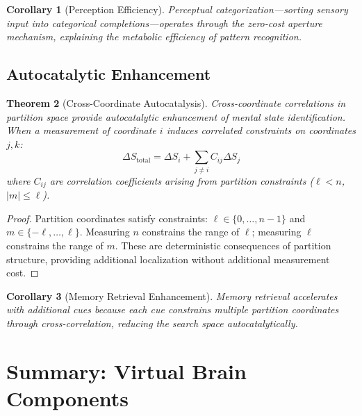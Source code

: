 \documentclass[aps,prd,twocolumn,superscriptaddress,floatfix,nofootinbib]{revtex4-2}
\newtheorem{theorem}{Theorem}[section]
\newtheorem{corollary}[theorem]{Corollary}
\theoremstyle{remark}
\begin{document}
\begin{corollary}[Perception Efficiency]
\label{cor:perception_efficiency}
Perceptual categorization---sorting sensory input into categorical completions---operates through the zero-cost aperture mechanism, explaining the metabolic efficiency of pattern recognition.
\end{corollary}

\subsection{Autocatalytic Enhancement}

\begin{theorem}[Cross-Coordinate Autocatalysis]
\label{thm:autocatalysis}
Cross-coordinate correlations in partition space provide autocatalytic enhancement of mental state identification. When a measurement of coordinate $i$ induces correlated constraints on coordinates $j, k$:
\begin{equation}
\Delta S_{\text{total}} = \Delta S_i + \sum_{j \neq i} C_{ij} \Delta S_j
\end{equation}
where $C_{ij}$ are correlation coefficients arising from partition constraints ($\ell < n$, $|m| \leq \ell$).
\end{theorem}

\begin{proof}
Partition coordinates satisfy constraints: $\ell \in \{0, \ldots, n-1\}$ and $m \in \{-\ell, \ldots, \ell\}$. Measuring $n$ constrains the range of $\ell$; measuring $\ell$ constrains the range of $m$. These are deterministic consequences of partition structure, providing additional localization without additional measurement cost.
\end{proof}

\begin{corollary}[Memory Retrieval Enhancement]
\label{cor:memory_retrieval}
Memory retrieval accelerates with additional cues because each cue constrains multiple partition coordinates through cross-correlation, reducing the search space autocatalytically.
\end{corollary}

\section{Summary: Virtual Brain Components}
\label{sec:summary}
\end{document}
